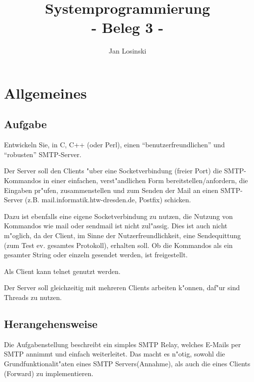 \documentclass[pdftex,final,a4paper,10pt,notitlepage,halfparskip]{scrreprt}
\title{Systemprogrammierung\\
- Beleg 3 -}
\author{Jan Losinski}
\begin{document}
\maketitle

\tableofcontents

\chapter{Allgemeines}
\section{Aufgabe}
Entwickeln Sie, in C, C++ (oder Perl), einen "`benutzerfreundlichen"' und "`robusten"' SMTP-Server.

Der Server soll den Clients "{u}ber eine Socketverbindung (freier Port) die SMTP-Kommandos in einer einfachen, verst"{a}ndlichen Form bereitstellen/anfordern, die Eingaben pr"{u}fen, zusammenstellen und zum Senden der Mail an einen SMTP-Server (z.B. mail.informatik.htw-dresden.de, Postfix) schicken. 

Dazu ist ebenfalls eine eigene Socketverbindung zu nutzen, die Nutzung von Kommandos wie mail oder sendmail ist nicht zul"{a}ssig. Dies ist auch nicht m"{o}glich, da der Client, im Sinne der Nutzerfreundlichkeit, eine Sendequittung (zum Test ev. gesamtes Protokoll), erhalten soll. Ob die Kommandos als ein gesamter String oder einzeln gesendet werden, ist freigestellt.

Als Client kann telnet genutzt werden.

Der Server soll gleichzeitig mit mehreren Clients arbeiten k"{o}nnen, daf"{u}r sind Threads zu nutzen.

\section{Herangehensweise}
Die Aufgabenstellung beschreibt ein simples SMTP Relay, welches E-Mails per SMTP annimmt und einfach weiterleitet. Das macht es n"{o}tig, sowohl die Grundfunktionalit"{a}ten eines SMTP Servers(Annahme), als auch die eines Clients (Forward) zu implementieren.
\end{document}
